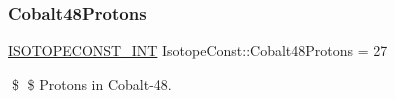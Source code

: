 \subsubsection{\texorpdfstring{Cobalt48\+Protons}{Cobalt48Protons}}
{\footnotesize\ttfamily \mbox{\hyperlink{group___isotope_const-_macros_ga5f18360b3e99483a35c32d789e62621c}{I\+S\+O\+T\+O\+P\+E\+C\+O\+N\+S\+T\+\_\+\+I\+NT}} Isotope\+Const\+::\+Cobalt48\+Protons = 27}

\$ \$ Protons in Cobalt-\/48. 